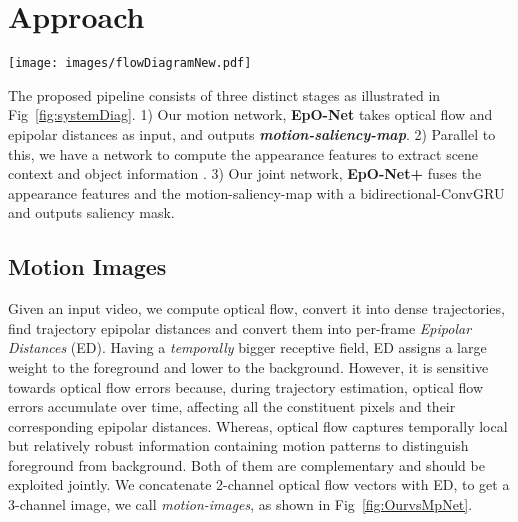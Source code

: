 \documentclass[10pt,twocolumn,letterpaper]{article}
\newcommand{\rowSpace}{\vspace{-0.4cm}}
\begin{document}
 
\section{Approach}
\begin{figure*}    
\center
\rowSpace
\texttt{[image: images/flowDiagramNew.pdf]}
\caption{Flow diagram depicting different parts \& information transition in the algorithm. Top Row: steps to compute the motion trajectories \& Epipolar Distance. Bottom row: (Left) Deep-Lab based Appearance Network trained to compute the Appearance Features. (Right) Motion-Images (Optical Flow \& Epipolar Distance) fed to EpO, which outputs motion saliency map. (Middle) Motion-saliency map concatenated with appearance features are fed into the bidirectional convGRU.}
\rowSpace
\label{fig:systemDiag}
\end{figure*}

The proposed pipeline consists of three distinct stages as illustrated in Fig~\ref{fig:systemDiag}. 1) Our motion network, \textbf{EpO-Net} takes optical flow and epipolar distances as input, and outputs \textit{\textbf{motion-saliency-map}}. 2) Parallel to this, we have a network to compute the appearance features to extract scene context and object information \cite{deeplab}. 3) Our joint network, \textbf{EpO-Net+} fuses the appearance features and the motion-saliency-map with a bidirectional-ConvGRU and outputs saliency mask. 

\subsection{Motion Images}
Given an input video, we compute optical flow, convert it into dense trajectories, find trajectory epipolar distances and convert them into per-frame \textit{Epipolar Distances} (ED).
Having a \textit{temporally} bigger receptive field, ED assigns a large weight to the foreground and lower to the background. 
However, it is sensitive towards optical flow errors because, during trajectory estimation, optical flow errors accumulate over time, affecting all the constituent pixels and their corresponding epipolar distances.
Whereas, optical flow captures temporally local but relatively robust information containing motion patterns to distinguish foreground from background. Both of them are complementary and should be exploited jointly. We concatenate 2-channel optical flow vectors with ED, to get a 3-channel image, we call \textit{motion-images}, as shown in Fig~\ref{fig:OurvsMpNet}.
\end{document}
